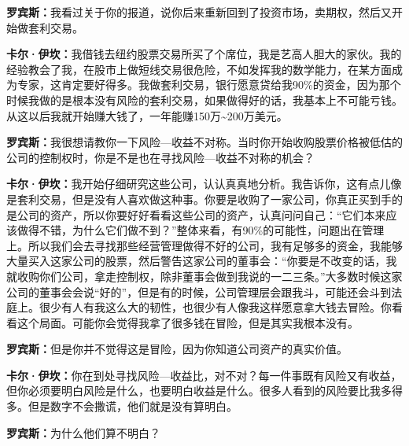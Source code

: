 \begin{BookQuote}
\textbf{罗宾斯：}我看过关于你的报道，说你后来重新回到了投资市场，卖期权，然后又开始做套利交易。
\end{BookQuote}

\begin{BookQuote}
\textbf{卡尔·伊坎：}我借钱去纽约股票交易所买了个席位，我是艺高人胆大的家伙。我的经验教会了我，在股市上做短线交易很危险，不如发挥我的数学能力，在某方面成为专家，这肯定要好得多。我做套利交易，银行愿意贷给我90\%的资金，因为那个时候我做的是根本没有风险的套利交易，如果做得好的话，我基本上不可能亏钱。从这以后我就开始赚大钱了，一年能赚150万\textasciitilde{}200万美元。
\end{BookQuote}

\begin{BookQuote}
\textbf{罗宾斯：}我很想请教你一下风险—收益不对称。当时你开始收购股票价格被低估的公司的控制权时，你是不是也在寻找风险—收益不对称的机会？
\end{BookQuote}

\begin{BookQuote}
\textbf{卡尔·伊坎：}我开始仔细研究这些公司，认认真真地分析。我告诉你，这有点儿像是套利交易，但是没有人喜欢做这种事。你要是收购了一家公司，你真正买到手的是公司的资产，所以你要好好看看这些公司的资产，认真问问自己：“它们本来应该做得不错，为什么它们做不到？”整体来看，有90\%的可能性，问题出在管理上。所以我们会去寻找那些经营管理做得不好的公司，我有足够多的资金，我能够大量买入这家公司的股票，然后警告这家公司的董事会：“你要是不改变的话，我就收购你们公司，拿走控制权，除非董事会做到我说的一二三条。”大多数时候这家公司的董事会会说“好的”，但是有的时候，公司管理层会跟我斗，可能还会斗到法庭上。很少有人有我这么大的韧性，也很少有人像我这样愿意拿大钱去冒险。你看看这个局面。可能你会觉得我拿了很多钱在冒险，但是其实我根本没有。
\end{BookQuote}

\begin{BookQuote}
\textbf{罗宾斯：}但是你并不觉得这是冒险，因为你知道公司资产的真实价值。
\end{BookQuote}

\begin{BookQuote}
\textbf{卡尔·伊坎：}你在到处寻找风险—收益比，对不对？每一件事既有风险又有收益，但你必须要明白风险是什么，也要明白收益是什么。很多人看到的风险要比我多得多。但是数字不会撒谎，他们就是没有算明白。
\end{BookQuote}

\begin{BookQuote}
\textbf{罗宾斯：}为什么他们算不明白？
\end{BookQuote}

